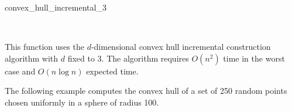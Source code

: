 \begin{ccRefFunction}{convex_hull_incremental_3}
\ccSeeAlso

 \\

\ccImplementation

This function uses the $d$-dimensional convex hull incremental construction 
algorithm \cite{cms-frric-93}
with $d$ fixed to 3.  The algorithm requires $O(n^2)$ time in the
worst case and $O(n \log n)$ expected time.

\ccSeeAlso


\ccExample

The following example computes the convex hull of a set of 250 random 
points chosen uniformly in a sphere of radius 100.


\end{ccRefFunction}


